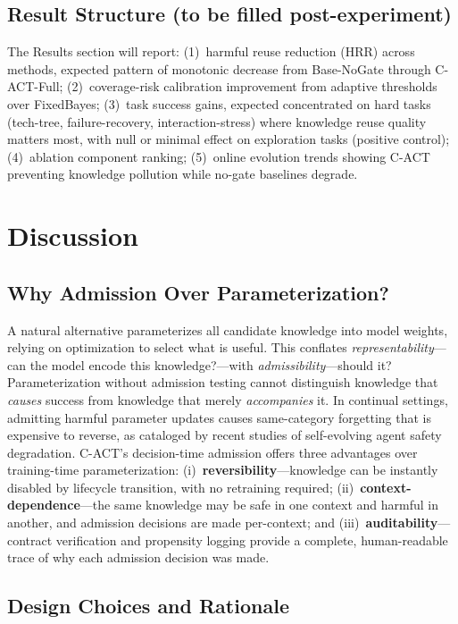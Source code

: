 \documentclass[letterpaper]{article}
\begin{document}
\subsection{Result Structure (to be filled post-experiment)}

The Results section will report: (1)~harmful reuse reduction (HRR) across methods, expected pattern of monotonic decrease from Base-NoGate through C-ACT-Full; (2)~coverage-risk calibration improvement from adaptive thresholds over FixedBayes; (3)~task success gains, expected concentrated on hard tasks (tech-tree, failure-recovery, interaction-stress) where knowledge reuse quality matters most, with null or minimal effect on exploration tasks (positive control); (4)~ablation component ranking; (5)~online evolution trends showing C-ACT preventing knowledge pollution while no-gate baselines degrade.

\section{Discussion}

\subsection{Why Admission Over Parameterization?}

A natural alternative parameterizes all candidate knowledge into model weights, relying on optimization to select what is useful. This conflates \emph{representability}---can the model encode this knowledge?---with \emph{admissibility}---should it? Parameterization without admission testing cannot distinguish knowledge that \emph{causes} success from knowledge that merely \emph{accompanies} it. In continual settings, admitting harmful parameter updates causes same-category forgetting that is expensive to reverse, as cataloged by recent studies of self-evolving agent safety degradation. \textsc{C-ACT}'s decision-time admission offers three advantages over training-time parameterization: (i)~\textbf{reversibility}---knowledge can be instantly disabled by lifecycle transition, with no retraining required; (ii)~\textbf{context-dependence}---the same knowledge may be safe in one context and harmful in another, and admission decisions are made per-context; and (iii)~\textbf{auditability}---contract verification and propensity logging provide a complete, human-readable trace of why each admission decision was made.

\subsection{Design Choices and Rationale}
\end{document}
